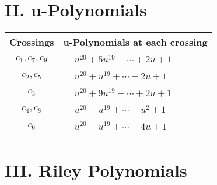 \documentclass[1p]{elsarticle_modified}
\theoremstyle{definition}
\begin{document}
\centering \section*{ II. u-Polynomials}
\begin{tabular}{m{50pt}|m{274pt}}
Crossings & \hspace{64pt}u-Polynomials at each crossing \\
\hline $$\begin{aligned}c_{1},c_{7},c_{9}\end{aligned}$$&$\begin{aligned}
&u^{20}+5 u^{19}+\cdots+2 u+1
\end{aligned}$\\
\hline $$\begin{aligned}c_{2},c_{5}\end{aligned}$$&$\begin{aligned}
&u^{20}+u^{19}+\cdots+2 u+1
\end{aligned}$\\
\hline $$\begin{aligned}c_{3}\end{aligned}$$&$\begin{aligned}
&u^{20}+9 u^{19}+\cdots+2 u+1
\end{aligned}$\\
\hline $$\begin{aligned}c_{4},c_{8}\end{aligned}$$&$\begin{aligned}
&u^{20}- u^{19}+\cdots+u^2+1
\end{aligned}$\\
\hline $$\begin{aligned}c_{6}\end{aligned}$$&$\begin{aligned}
&u^{20}- u^{19}+\cdots-4 u+1
\end{aligned}$\\
\hline
\end{tabular}\newpage\renewcommand{\arraystretch}{1}
\centering \section*{ III. Riley Polynomials}
\end{document}
